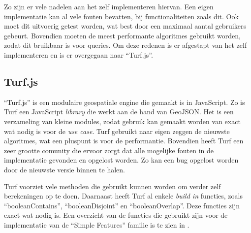 Zo zijn er vele nadelen aan het zelf implementeren hiervan. Een eigen implementatie kan al vele fouten bevatten, bij functionaliteiten zoals dit. Ook moet dit uitvoerig getest worden, wat best door een maximaal aantal gebruikers gebeurt. Bovendien moeten de meest performante algoritmes gebruikt worden, zodat dit bruikbaar is voor queries. Om deze redenen is er afgestapt van het zelf implementeren en is er overgegaan naar ``Turf.js''.

\subsection{Turf.js}
``Turf.js'' is een modulaire geospatiale engine die gemaakt is in JavaScript. Zo is Turf een JavaScript \textit{library} die werkt aan de hand van GeoJSON. Het is een verzameling van kleine modules, zodat gebruik kan gemaakt worden van exact wat nodig is voor de \textit{use case}. Turf gebruikt naar eigen zeggen de nieuwste algoritmes, wat een pluspunt is voor de performantie. Bovendien heeft Turf een zeer grootte comunity die ervoor zorgt dat alle mogelijke fouten in de implementatie gevonden en opgelost worden. Zo kan een bug opgelost worden door de nieuwste versie binnen te halen.

Turf voorziet vele methoden die gebruikt kunnen worden om verder zelf berekeningen op te doen. Daarnaast heeft Turf al enkele \textit{build in} functies, zoals ``booleanContains'', ``booleanDisjoint'' en ``booleanOverlap''. Deze functies zijn exact wat nodig is. Een overzicht van de functies die gebruikt zijn voor de implementatie van de ``Simple Features'' familie is te zien in .

